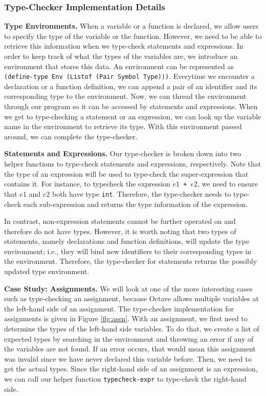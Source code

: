 \subsubsection{Type-Checker Implementation Details}
{\bf Type Environments.} When a variable or a function is declared, we allow users to specify the type of the variable or the function. However, we need to be able to retrieve this information when we type-check statements and expressions. In order to keep track of what the types of the variables are, we introduce an environment that stores this data. An environment can be represented as {\tt (define-type Env (Listof (Pair Symbol Type)))}. Everytime we encounter a declaration or a function definition, we can append a pair of an identifier and its corresponding type to the environment. Now, we can thread the environment through our program so it can be accessed by statements and expressions. When we get to type-checking a statement or an expression, we can look up the variable name in the environment to retrieve its type. With this environment passed around, we can complete the type-checker. 

{\bf Statements and Expressions.} Our type-checker is broken down into two helper functions to type-check statements and expressions, respectively. Note that the type of an expression will be used to type-check the super-expression that contains it. For instance, to typecheck the expression {\tt $e1$ + $e2$}, we need to ensure that $e1$ and $e2$ both have type {\tt int}. Therefore, the type-checker needs to type-check each sub-expression and returns the type information of the expression.

In contrast, non-expression statements cannot be further operated on and therefore do not have types. However, it is worth noting that two types of statements, namely declarations and function definitions, will update the type environment; i.e., they will bind new identifiers to their corresponding types in the environment. Therefore, the type-checker for statements returns the possibly updated type environment.

{\bf Case Study: Assignments.} We will look at one of the more interesting cases such as type-checking an assignment, because Octave allows multiple variables at the left-hand side of an assignment. The type-checker implementation for assignments is given in Figure \ref{fig:assn}. With an assignment, we first need to determine the types of the left-hand side variables. To do that, we create a list of expected types by searching in the environment and throwing an error if any of the variables are not found. If an error occurs, that would mean this assignment was invalid since we have never declared this variable before. Then, we need to get the actual types. Since the right-hand side of an assignment is an expression, we can call our helper function {\tt typecheck-expr} to type-check the right-hand side.


